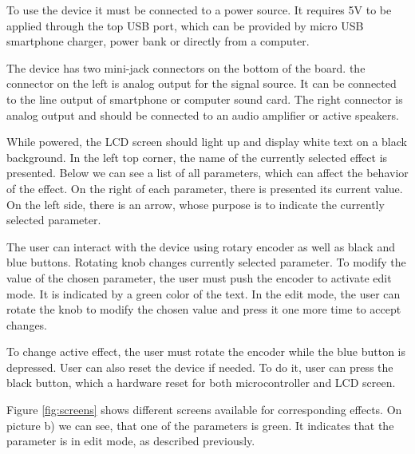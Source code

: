 \documentclass[a4paper,twoside,12pt]{book}
\begin{document}
To use the device it must be connected to a power source.
It requires 5V to be applied through the top USB port,
which can be provided by micro USB smartphone charger,
power bank or directly from a computer.

The device has two mini-jack connectors on the bottom of the board.
the connector on the left is analog output for the signal source.
It can be connected to the line output of smartphone or computer sound card.
The right connector is analog output and should be connected
to an audio amplifier or active speakers.

While powered, the LCD screen should light up
and display white text on a black background.
In the left top corner, the name of the currently selected effect is presented.
Below we can see a list of all parameters,
which can affect the behavior of the effect.
On the right of each parameter, there is presented its current value.
On the left side, there is an arrow,
whose purpose is to indicate the currently selected parameter.

The user can interact with the device using rotary encoder
as well as black and blue buttons.
Rotating knob changes currently selected parameter.
To modify the value of the chosen parameter, the user must push the encoder
to activate edit mode. It is indicated by a green color of the text.
In the edit mode, the user can rotate the knob to modify the chosen value
and press it one more time to accept changes.

To change active effect, the user must rotate the encoder
while the blue button is depressed. User can also reset the device if needed.
To do it, user can press the black button,
which a hardware reset for both microcontroller and LCD screen.

Figure \ref{fig:screens} shows different screens
available for corresponding effects.
On picture b) we can see, that one of the parameters is green.
It indicates that the parameter is in edit mode, as described previously.
\end{document}
